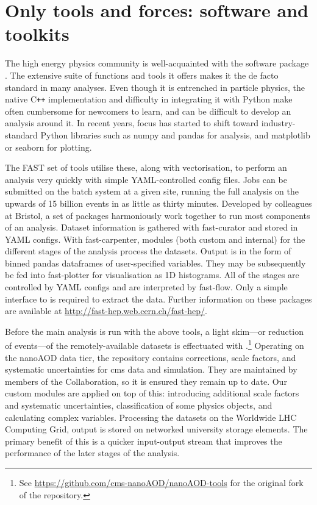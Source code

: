 

\section{Only tools and forces: software and toolkits}
\label{sec:htoinv_software}

The high energy physics community is well-acquainted with the software package \ROOT. The extensive suite of functions and tools it offers makes it the de facto standard in many analyses. Even though it is entrenched in particle physics, the native C\texttt{++} implementation and difficulty in integrating it with Python make \ROOT often cumbersome for newcomers to learn, and can be difficult to develop an analysis around it. In recent years, focus has started to shift toward industry-standard Python libraries such as \textsf{numpy} and \textsf{pandas} for analysis, and \textsf{matplotlib} or \textsf{seaborn} for plotting.

The FAST set of tools utilise these, along with vectorisation, to perform an analysis very quickly with simple YAML-controlled config files. Jobs can be submitted on the batch system at a given site, running the full analysis on the upwards of 15 billion events in as little as thirty minutes. Developed by colleagues at Bristol, a set of packages harmoniously work together to run most components of an analysis. Dataset information is gathered with \textsf{fast-curator} and stored in YAML configs. With \textsf{fast-carpenter}, modules (both custom and internal) for the different stages of the analysis process the datasets. Output is in the form of binned \textsf{pandas} dataframes of user-specified variables. They may be subsequently be fed into \textsf{fast-plotter} for visualisation as 1D histograms. All of the stages are controlled by YAML configs and are interpreted by \textsf{fast-flow}. Only a simple interface to \ROOT is required to extract the data. Further information on these packages are available at \url{http://fast-hep.web.cern.ch/fast-hep/}.

Before the main analysis is run with the above tools, a light skim---or reduction of events---of the remotely-available datasets is effectuated with \nanoAODtools.\footnote{See \url{https://github.com/cms-nanoAOD/nanoAOD-tools} for the original fork of the repository.} Operating on the nanoAOD data tier, the repository contains corrections, scale factors, and systematic uncertainties for \acrshort{cms} data and simulation. They are maintained by members of the Collaboration, so it is ensured they remain up to date. Our custom modules are applied on top of this: introducing additional scale factors and systematic uncertainties, classification of some physics objects, and calculating complex variables. Processing the datasets on the Worldwide LHC Computing Grid, output is stored on networked university storage elements. The primary benefit of this is a quicker input-output stream that improves the performance of the later stages of the analysis.
